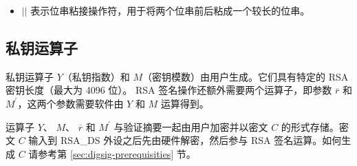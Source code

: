 \documentclass[main\_\_CN.tex]{subfiles}
\begin{document}
\begin{itemize}
    \item
        \begin{math}{ || }\end{math}  \hspace{1.0cm}        表示位串粘接操作符，用于将两个位串前后粘成一个较长的位串。
\end{itemize}



\subsection{私钥运算子}
\label{sec:digsig-private-key-operands}

私钥运算子 \begin{math}Y\end{math}（私钥指数）和 \begin{math}M\end{math}（密钥模数）由用户生成。它们具有特定的 RSA 密钥长度（最大为 4096 位）。
RSA 签名操作还额外需要两个运算子，即参数 \begin{math}\overline{r}\end{math} 和 \begin{math}M^{\prime}\end{math}，这两个参数需要软件由 \begin{math}Y\end{math} 和 \begin{math}M\end{math} 运算得到。


运算子 \begin{math}Y\end{math}、
\begin{math}M\end{math}、
\begin{math}\overline{r}\end{math} 和
\begin{math}M^{\prime}\end{math} 与验证摘要一起由用户加密并以密文 \begin{math}C\end{math} 的形式存储。密文 \begin{math}C\end{math} 输入到 RSA\_DS 外设之后先由硬件解密，然后参与 RSA 签名运算。如何生成 \begin{math}C\end{math} 请参考第 \ref{sec:digsig-prerequisities} 节。
\end{document}
